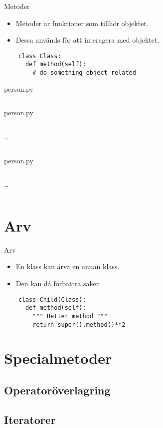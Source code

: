 \begin{frame}[fragile]
  \begin{block}{Metoder}
    \begin{itemize}
      \item Metoder är funktioner som tillhör objektet.
      \item Dessa används för att interagera med objektet.
    \end{itemize}
  \end{block}

  \begin{verbatim}
    class Class:
      def method(self):
        # do something object related
  \end{verbatim}
\end{frame}

\begin{frame}[fragile]
  person.py \hrulefill
  \inputminted[linenos,lastline=8]{python}{examples/person.py}
\end{frame}

\begin{frame}[fragile]
  person.py \hrulefill
  \inputminted[linenos,firstline=3,lastline=4]{python}{examples/person.py}
  \dots
  \inputminted[autogobble=false,linenos,firstline=10,lastline=16]{python}{examples/person.py}
\end{frame}

\begin{frame}[fragile]
  person.py \hrulefill
  \inputminted[linenos,firstline=3,lastline=5]{python}{examples/person.py}
  \dots
  \inputminted[linenos,firstline=35,lastline=39]{python}{examples/person.py}
\end{frame}


\section{Arv}

\begin{frame}[fragile]
  \begin{block}{Arv}
    \begin{itemize}
      \item En klass kan ärva en annan klass.
      \item Den kan då förbättra saker.
    \end{itemize}
  \end{block}

  \begin{verbatim}
    class Child(Class):
      def method(self):
        """ Better method """
        return super().method()**2
  \end{verbatim}
\end{frame}


\section{Specialmetoder}

\subsection{Operatoröverlagring}

\subsection{Iteratorer}

